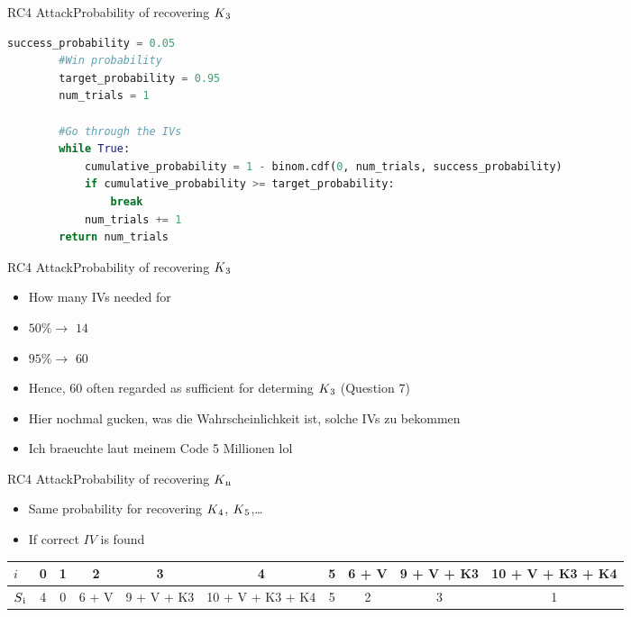\documentclass[
	aspectratio=169,	%
	onlytextwidth,		%
	t,					%
	]{beamer}
\begin{document}
\begin{frame}[fragile]{RC4 Attack}{Probability of recovering $K\textsubscript{3}$}
	\begin{lstlisting}[language=Python]
		success_probability = 0.05
		#Win probability
		target_probability = 0.95
		num_trials = 1

		#Go through the IVs
		while True:
			cumulative_probability = 1 - binom.cdf(0, num_trials, success_probability)
			if cumulative_probability >= target_probability:
				break
			num_trials += 1
		return num_trials
	\end{lstlisting}
\end{frame}

\begin{frame}[fragile]{RC4 Attack}{Probability of recovering $K\textsubscript{3}$}
	\begin{itemize}
		\item How many IVs needed for 
		\item $50\% \rightarrow$ $14$
		\item $95\% \rightarrow$ $60$
		\item Hence, $60$ often regarded as sufficient for determing $K\textsubscript{3}$ (Question 7)
		\item Hier nochmal gucken, was die Wahrscheinlichkeit ist, solche IVs zu bekommen 
		\item Ich braeuchte laut meinem Code 5 Millionen lol
	\end{itemize}
\end{frame}

\begin{frame}[fragile]{RC4 Attack}{Probability of recovering $K\textsubscript{n}$}
	\begin{itemize}
		\item Same probability for recovering $K\textsubscript{4}$, $K\textsubscript{5}$,\dots
		\item If correct $IV$ is found
	\end{itemize}
		\bigskip
		\small
		\begin{tabular}{l|c|c|c|c|c|c|c|c|c}
		$i$ & 0 & 1 & 2 & 3 & 4 & 5 & 6 + V & 9 + V + K3 & 10 + V + K3 + K4\\
		\hline
		$S\textsubscript{i}$ & 4 & 0 & 6 + V & 9 + V + K3 & 10 + V + K3 + K4 & 5 & 2 & 3 & 1\\
		\end{tabular}
		\normalsize
\end{frame}
\end{document}
